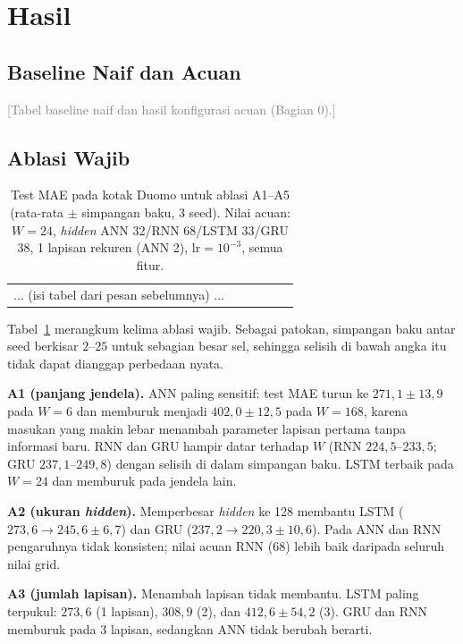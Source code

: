 \documentclass[conference,a4paper]{IEEEtran}
\newcommand{\petunjuk}[1]{\textcolor{gray}{[#1]}}
\begin{document}
\section{Hasil}

\subsection{Baseline Naif dan Acuan}
\petunjuk{Tabel baseline naif dan hasil konfigurasi acuan (Bagian 0).}

\subsection{Ablasi Wajib}
\begin{table}[t]
  \centering
  \caption{Test MAE pada kotak Duomo untuk ablasi A1--A5 (rata-rata $\pm$ simpangan baku, 3 seed). Nilai acuan: $W=24$, \textit{hidden} ANN 32/RNN 68/LSTM 33/GRU 38, 1 lapisan rekuren (ANN 2), $\mathrm{lr}=10^{-3}$, semua fitur.}
  \label{tab:ablasi}
  \footnotesize
  \setlength{\tabcolsep}{4pt}
  \begin{tabular}{@{}llcccc@{}}
    ... (isi tabel dari pesan sebelumnya) ...
  \end{tabular}
\end{table}
Tabel~\ref{tab:ablasi} merangkum kelima ablasi wajib. Sebagai patokan,
simpangan baku antar seed berkisar $2$--$25$ untuk sebagian besar sel,
sehingga selisih di bawah angka itu tidak dapat dianggap perbedaan nyata.

\textbf{A1 (panjang jendela).} ANN paling sensitif: test MAE turun ke
$271{,}1 \pm 13{,}9$ pada $W=6$ dan memburuk menjadi $402{,}0 \pm 12{,}5$ pada
$W=168$, karena masukan yang makin lebar menambah parameter lapisan pertama
tanpa informasi baru. RNN dan GRU hampir datar terhadap $W$ (RNN $224{,}5$--$233{,}5$;
GRU $237{,}1$--$249{,}8$) dengan selisih di dalam simpangan baku. LSTM terbaik pada
$W=24$ dan memburuk pada jendela lain.

\textbf{A2 (ukuran \textit{hidden}).} Memperbesar \textit{hidden} ke 128
membantu LSTM ($273{,}6 \rightarrow 245{,}6 \pm 6{,}7$) dan GRU
($237{,}2 \rightarrow 220{,}3 \pm 10{,}6$). Pada ANN dan RNN pengaruhnya tidak
konsisten; nilai acuan RNN (68) lebih baik daripada seluruh nilai grid.

\textbf{A3 (jumlah lapisan).} Menambah lapisan tidak membantu. LSTM paling
terpukul: $273{,}6$ (1 lapisan), $308{,}9$ (2), dan $412{,}6 \pm 54{,}2$ (3).
GRU dan RNN memburuk pada 3 lapisan, sedangkan ANN tidak berubah berarti.
\end{document}
